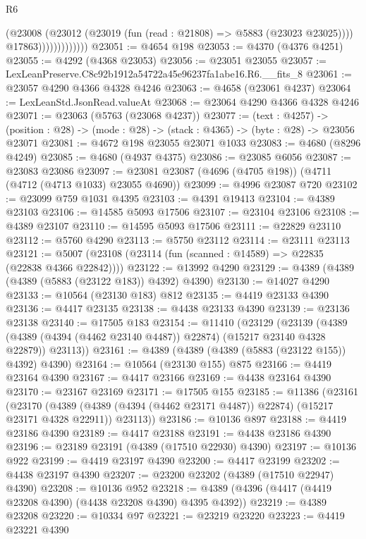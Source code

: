 \begin{lexlean}{R6}
\begin{coremodule}
                            (@23008
                              (@23012 (@23019 (fun (read : @21808) => @5883 (@23023 @23025))))
                              @17863)))))))))))))
@23051 := @4654 @198
@23053 := @4370 (@4376 @4251)
@23055 := @4292 (@4368 @23053)
@23056 := @23051 @23055
@23057 := LexLeanPreserve.C8c92b1912a54722a45e96237fa1abe16.R6.__fits_8
@23061 := @23057 @4290 @4366 @4328 @4246
@23063 := @4658 (@23061 @4237)
@23064 := LexLeanStd.JsonRead.valueAt
@23068 := @23064 @4290 @4366 @4328 @4246
@23071 := @23063 (@5763 (@23068 @4237))
@23077 := (text : @4257) ->
  (position : @28) -> (mode : @28) -> (stack : @4365) -> (byte : @28) -> @23056 @23071
@23081 := @4672 @198 @23055 @23071 @1033
@23083 := @4680 (@8296 @4249)
@23085 := @4680 (@4937 @4375)
@23086 := @23085 @6056
@23087 := @23083 @23086
@23097 := @23081 @23087 (@4696 (@4705 @198)) (@4711 (@4712 (@4713 @1033) @23055 @4690))
@23099 := @4996 @23087 @720
@23102 := @23099 @759 @1031 @4395
@23103 := @4391 @19413
@23104 := @4389 @23103
@23106 := @14585 @5093 @17506
@23107 := @23104 @23106
@23108 := @4389 @23107
@23110 := @14595 @5093 @17506
@23111 := @22829 @23110
@23112 := @5760 @4290
@23113 := @5750 @23112
@23114 := @23111 @23113
@23121 := @5007 (@23108 (@23114 (fun (scanned : @14589) => @22835 (@22838 @4366 @22842))))
@23122 := @13992 @4290
@23129 := @4389 (@4389 (@4389 (@5883 (@23122 @183)) @4392) @4390)
@23130 := @14027 @4290
@23133 := @10564 (@23130 @183) @812
@23135 := @4419 @23133 @4390
@23136 := @4417 @23135
@23138 := @4438 @23133 @4390
@23139 := @23136 @23138
@23140 := @17505 @183
@23154 := @11410
    (@23129
      (@23139
        (@4389 (@4389 (@4394 (@4462 @23140 @4487)) @22874) (@15217 @23140 @4328 @22879))
        @23113))
@23161 := @4389 (@4389 (@4389 (@5883 (@23122 @155)) @4392) @4390)
@23164 := @10564 (@23130 @155) @875
@23166 := @4419 @23164 @4390
@23167 := @4417 @23166
@23169 := @4438 @23164 @4390
@23170 := @23167 @23169
@23171 := @17505 @155
@23185 := @11386
    (@23161
      (@23170
        (@4389 (@4389 (@4394 (@4462 @23171 @4487)) @22874) (@15217 @23171 @4328 @22911))
        @23113))
@23186 := @10136 @897
@23188 := @4419 @23186 @4390
@23189 := @4417 @23188
@23191 := @4438 @23186 @4390
@23196 := @23189 @23191 (@4389 (@17510 @22930) @4390)
@23197 := @10136 @922
@23199 := @4419 @23197 @4390
@23200 := @4417 @23199
@23202 := @4438 @23197 @4390
@23207 := @23200 @23202 (@4389 (@17510 @22947) @4390)
@23208 := @10136 @952
@23218 := @4389 (@4396 (@4417 (@4419 @23208 @4390) (@4438 @23208 @4390) @4395 @4392))
@23219 := @4389 @23208
@23220 := @10334 @97
@23221 := @23219 @23220
@23223 := @4419 @23221 @4390

\end{coremodule}
\end{lexlean}
